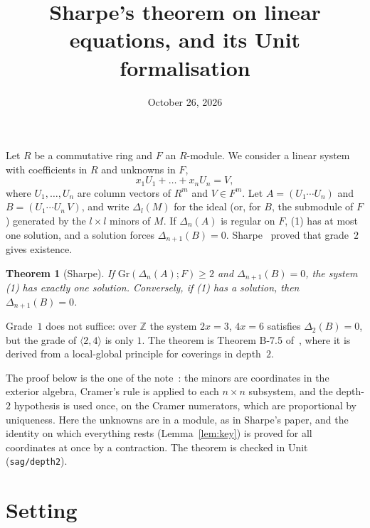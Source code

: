 \documentclass[11pt]{amsart}
\title{Sharpe's theorem on linear equations, and its Unit formalisation}
\date{October 26, 2026}
\newtheorem{theorem}{Theorem}
\theoremstyle{definition}
\theoremstyle{remark}
\newcommand{\code}[1]{\texttt{#1}}
\newcommand{\Gr}{\mathrm{Gr}}
\begin{document}
\maketitle

Let $R$ be a commutative ring and $F$ an $R$-module.  We consider a
linear system with coefficients in $R$ and unknowns in $F$,
\[
  x_1U_1+\dots+x_nU_n=V,\tag{1}
\]
where $U_1,\dots,U_n$ are column vectors of $R^m$ and $V\in F^m$.  Let
$A=(U_1\cdots U_n)$ and $B=(U_1\cdots U_n\,V)$, and write $\Delta_l(M)$
for the ideal (or, for $B$, the submodule of $F$) generated by the
$l\times l$ minors of $M$.  If $\Delta_n(A)$ is regular on $F$, (1) has at
most one solution, and a solution forces $\Delta_{n+1}(B)=0$.
Sharpe~\cite{Sharpe} proved that grade~$2$ gives existence.

\begin{theorem}[Sharpe]\label{thm:sharpe}
If $\Gr(\Delta_n(A);F)\geq2$ and $\Delta_{n+1}(B)=0$, the system (1) has
exactly one solution.  Conversely, if (1) has a solution, then
$\Delta_{n+1}(B)=0$.
\end{theorem}

Grade~$1$ does not suffice: over $\mathbb Z$ the system $2x=3$, $4x=6$
satisfies $\Delta_2(B)=0$, but the grade of $\langle2,4\rangle$ is only
$1$.  The theorem is Theorem B-7.5 of~\cite{CL}, where it is derived from
a local-global principle for coverings in depth~$2$.

The proof below is the one of the note~\cite{Co10}: the minors are
coordinates in the exterior algebra, Cramer's rule is applied to each
$n\times n$ subsystem, and the depth-$2$ hypothesis is used once, on the
Cramer numerators, which are proportional by uniqueness.  Here the
unknowns are in a module, as in Sharpe's paper, and the identity on which
everything rests (Lemma~\ref{lem:key}) is proved for all coordinates at
once by a contraction.  The theorem is checked in Unit
(\code{sag/depth2}).

\section{Setting}
\end{document}
